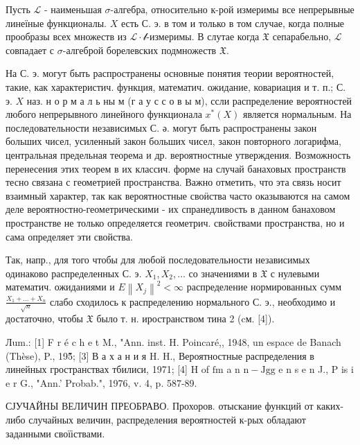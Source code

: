 \documentclass[10pt]{article}
\begin{document}
Пусть $\mathscr{L}$ - наименьшая $\sigma$-алгебра, относительно к-рой измеримы все непрерывные линеїные функционалы. $X$ есть С. э. в том и только в том случае, когда полные прообразы всех множеств из $\mathscr{L} \cdot \mathcal{l}$-измеримы. В слутае когда $\mathfrak{X}$ сепарабельно, $\mathscr{L}$ совпадает с $\sigma$-алгеброй борелевских подмножеств $\mathfrak{X}$.



На С. э. могут быть распространены основные понятия теории вероятностей, такие, как характеристич. функция, математич. ожидание, ковариация и т. п.; С. э. $X$ наз. н о р м а л ь ны м (г а у с с о в ы м), ссли распределение вероятностей любого непрерывного линейного функционала $x^{*}(X)$ является нормальным. На последовательности независимых С. ә. могут быть распространены закон больших чисел, усиленный закон больших чисел, закон повторного логарифма, центральная предельная теорема и др. вероятностные утверждения. Возможность перенесения этих теорем в их классич. форме на случай банаховых пространств тесно связана с геометрией пространства. Важно отметить, что эта связь носит взаимный характер, так как вероятностные своӥства часто оказываются на самом деле вероятностно-геометрическими - их спранедливость в данном банаховом пространстве не только определяется геометрич. свойствами пространства, но и сама определяет эти свойства.



Так, напр., для того чтобы для любой последовательности независимых одинаково распределенных С. э. $X_{1}, X_{2}, \ldots$ со значениями в $\mathfrak{X}$ с нулевыми математич. ожиданиями и $E\left\|X_{j}\right\|^{2}<\infty$ распределение нормированных сумм $\frac{X_{1}+\ldots+X_{n}}{\sqrt{n}}$ слабо сходилось к распределению нормального С. э., необходимо и достаточно, чтобы $\mathfrak{X}$ было т. н. иространством тина 2 (cм. [4]).



Лum.: [1] F r é c h e t M., "Ann. inst. H. Poincaré,, 1948, un espace de Banach (Thèse), P., 195̊̃; [3] В а х а н и я H. H., Вероятностные распределения в линейных гространствах тбилиси, 1971; [4] H of $\mathrm{fm}$ a n $\mathrm{n}-\mathrm{J} \boldsymbol{\mathrm { g }} \mathrm{g}$ e n s e n J., P is i e r G., "Ann.' Probab.", 1976, v. 4, p. 587-89.



СЈУЧАЙНЫ ВЕЛИЧИН ПРЕОБРАВО. Прохоров. отыскание функций от каких-либо случайных величин, распределения вероятностей к-рых обладают заданными своїіствами.
\end{document}
